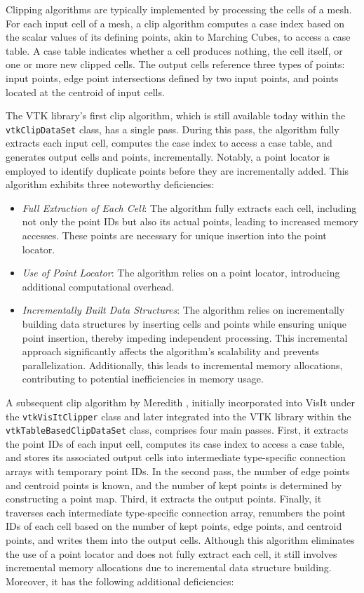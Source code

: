 \documentclass{egpubl}
\begin{document}
Clipping algorithms are typically implemented by processing the cells of a mesh. For each input cell of a mesh, a clip algorithm computes a case index based on the scalar values of its defining points, akin to Marching Cubes, to access a case table. A case table indicates whether a cell produces nothing, the cell itself, or one or more new clipped cells. The output cells reference three types of points: input points, edge point intersections defined by two input points, and points located at the centroid of input cells.

The VTK library's \cite{VTK} first clip algorithm, which is still available today within the \texttt{vtkClipDataSet} class, has a single pass. During this pass, the algorithm fully extracts each input cell, computes the case index to access a case table, and generates output cells and points, incrementally. Notably, a point locator is employed to identify duplicate points before they are incrementally added. This algorithm exhibits three noteworthy deficiencies:

\begin{itemize}
    \item \textit{Full Extraction of Each Cell}: The algorithm fully extracts each cell, including not only the point IDs but also its actual points, leading to increased memory accesses. These points are necessary for unique insertion into the point locator.
    \item \textit{Use of Point Locator}: The algorithm relies on a point locator, introducing additional computational overhead.
    \item \textit{Incrementally Built Data Structures}: The algorithm relies on incrementally building data structures by inserting cells and points while ensuring unique point insertion, thereby impeding independent processing. This incremental approach significantly affects the algorithm's scalability and prevents parallelization. Additionally, this leads to incremental memory allocations, contributing to potential inefficiencies in memory usage.
\end{itemize}

A subsequent clip algorithm by Meredith \cite{Clip}, initially incorporated into VisIt \cite{VisIt} under the \texttt{vtkVisItClipper} class and later integrated into the VTK library within the \texttt{vtkTableBasedClipDataSet} class, comprises four main passes.
First, it extracts the point IDs of each input cell, computes its case index to access a case table, and stores its associated output cells into intermediate type-specific connection arrays with temporary point IDs. In the second pass, the number of edge points and centroid points is known, and the number of kept points is determined by constructing a point map. Third, it extracts the output points. Finally, it traverses each intermediate type-specific connection array, renumbers the point IDs of each cell based on the number of kept points, edge points, and centroid points, and writes them into the output cells. Although this algorithm eliminates the use of a point locator and does not fully extract each cell, it still involves incremental memory allocations due to incremental data structure building. Moreover, it has the following additional deficiencies:
\end{document}
